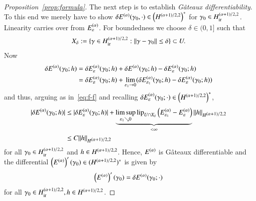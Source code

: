 \begin{proof}[Proposition~\ref{prop:formula}]
 The next step is to establish \emph{G\^ateaux differentiability}. To this end we merely have to show
 $\delta\E(\g_0,\cdot)\in\br{\W}^*$ for $\g_0\in\Wir$. Linearity carries over from $\Ee$. For boundedness we choose
 $\delta\in(0,1]$ such that
 \begin{equation*}
  X_\delta := \{ \gamma \in \Wir: \|\gamma- \gamma_0\| \leq \delta\} \subset U.
 \end{equation*}
 Now
 \begin{align*}
  \delta \E(\gamma_0;h) 
  &= \delta \Ee(\gamma_0;h) + \delta \E(\gamma_0;h) - \delta \Ee(\gamma_0;h)
  \\
  &= \delta \Ee(\gamma_0;h) + \lim_{\varepsilon_1 \rightarrow 0} 
   (\delta \E_{\varepsilon_1} (\gamma_0;h) - \delta \Ee(\gamma_0;h))
 \end{align*}
 and thus, arguing as in~\eqref{eq:f-f} and recalling $\delta\Ee(\g_0;\cdot)\in\br{\W}^*$,
\begin{equation*}
\begin{aligned}
  | \delta \E(\gamma_0;h) |& \leq | \delta \Ee(\gamma_0;h) |
  +  \underbrace{\limsup_{\eps_1\searrow0}\lip_{U\cap X_\delta}\br{\Ee[\eps_1]-\Ee[\eps]}}_{<\infty} \|h\|_{\W}
  \\ & \leq C \|h\|_{\W}
\end{aligned}
\end{equation*}
 for all $\gamma_0 \in \Wir$ and $h \in \W$. Hence, $\E$ is G\^ateaux differentiable  and the 
differential $\left(\E\right)'(\gamma_0) \in (\W)^\ast$ is given by
\begin{equation*}
 \left(\E\right)'(\gamma_0) = \delta \E(\gamma_0;\cdot)
\end{equation*}
for all $\gamma_0 \in \Wir, h \in \W$.


\end{proof}

